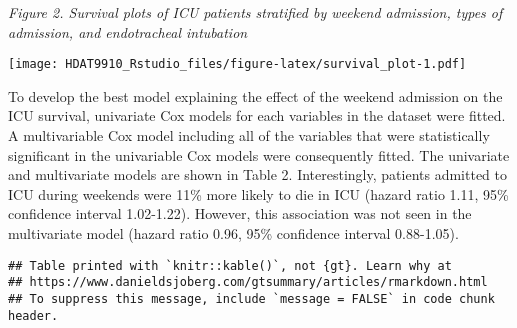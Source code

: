 \documentclass[
]{article}
\begin{document}
\emph{Figure 2. Survival plots of ICU patients stratified by weekend
admission, types of admission, and endotracheal intubation}

\texttt{[image: HDAT9910\_Rstudio\_files/figure-latex/survival\_plot-1.pdf]}

To develop the best model explaining the effect of the weekend admission
on the ICU survival, univariate Cox models for each variables in the
dataset were fitted. A multivariable Cox model including all of the
variables that were statistically significant in the univariable Cox
models were consequently fitted. The univariate and multivariate models
are shown in Table 2. Interestingly, patients admitted to ICU during
weekends were 11\% more likely to die in ICU (hazard ratio 1.11, 95\%
confidence interval 1.02-1.22). However, this association was not seen
in the multivariate model (hazard ratio 0.96, 95\% confidence interval
0.88-1.05).

\begin{verbatim}
## Table printed with `knitr::kable()`, not {gt}. Learn why at
## https://www.danieldsjoberg.com/gtsummary/articles/rmarkdown.html
## To suppress this message, include `message = FALSE` in code chunk header.
\end{verbatim}
\end{document}
